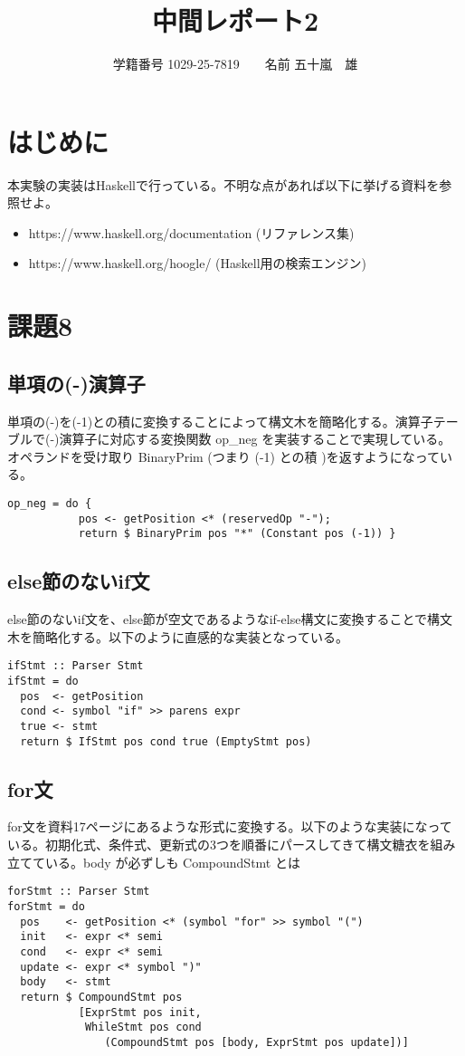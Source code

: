 \documentclass{jsarticle}
\begin{document}
\title{中間レポート2}
\author{学籍番号 1029-25-7819　　名前 五十嵐　雄}
\date{}
\maketitle

\section{はじめに}
本実験の実装はHaskellで行っている。不明な点があれば以下に挙げる資料を参照せよ。
\begin{itemize}
\item https://www.haskell.org/documentation (リファレンス集)
\item https://www.haskell.org/hoogle/ (Haskell用の検索エンジン)
\end{itemize}

\section{課題8}
\subsection{単項の(-)演算子}
単項の(-)を(-1)との積に変換することによって構文木を簡略化する。演算子テーブルで(-)演算子に対応する変換関数 op\_neg を実装することで実現している。オペランドを受け取り BinaryPrim (つまり (-1) との積 )を返すようになっている。
\begin{verbatim}
op_neg = do {
           pos <- getPosition <* (reservedOp "-");
           return $ BinaryPrim pos "*" (Constant pos (-1)) }
\end{verbatim}

\subsection{else節のないif文}
else節のないif文を、else節が空文であるようなif-else構文に変換することで構文木を簡略化する。以下のように直感的な実装となっている。
\begin{verbatim}
ifStmt :: Parser Stmt
ifStmt = do
  pos  <- getPosition
  cond <- symbol "if" >> parens expr
  true <- stmt
  return $ IfStmt pos cond true (EmptyStmt pos)
\end{verbatim}

\subsection{for文}
for文を資料17ページにあるような形式に変換する。以下のような実装になっている。初期化式、条件式、更新式の3つを順番にパースしてきて構文糖衣を組み立てている。body が必ずしも CompoundStmt とは
\begin{verbatim}
forStmt :: Parser Stmt
forStmt = do
  pos    <- getPosition <* (symbol "for" >> symbol "(")
  init   <- expr <* semi
  cond   <- expr <* semi
  update <- expr <* symbol ")"
  body   <- stmt
  return $ CompoundStmt pos
           [ExprStmt pos init,
            WhileStmt pos cond
               (CompoundStmt pos [body, ExprStmt pos update])]
\end{verbatim}
\end{document}
